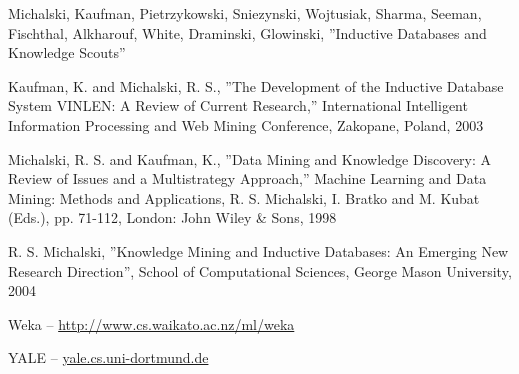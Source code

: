 \begin{thebibliography}{99}
 {Michalski, Kaufman, Pietrzykowski, Sniezynski,
    Wojtusiak, Sharma, Seeman, Fischthal, Alkharouf, White, Draminski,
    Glowinski, ''Inductive Databases and Knowledge Scouts''}

 {Kaufman, K. and Michalski, R. S., ''The Development
    of the Inductive Database System VINLEN: A Review of Current
    Research,'' International Intelligent Information Processing and
    Web Mining Conference, Zakopane, Poland, 2003}

 {Michalski, R. S. and Kaufman, K., ''Data Mining and
    Knowledge Discovery: A Review of Issues and a Multistrategy
    Approach,'' Machine Learning and Data Mining: Methods and
    Applications, R. S. Michalski, I. Bratko and M.  Kubat (Eds.), pp.
    71-112, London: John Wiley \& Sons, 1998}

 {R. S. Michalski, ''Knowledge Mining and Inductive
    Databases: An Emerging New Research Direction'', School of
    Computational Sciences, George Mason University, 2004}
    
 Weka -- \href{http://www.cs.waikato.ac.nz/ml/weka}{http://www.cs.waikato.ac.nz/ml/weka}

 YALE -- \href{yale.cs.uni-dortmund.de}{yale.cs.uni-dortmund.de}

\end{thebibliography}